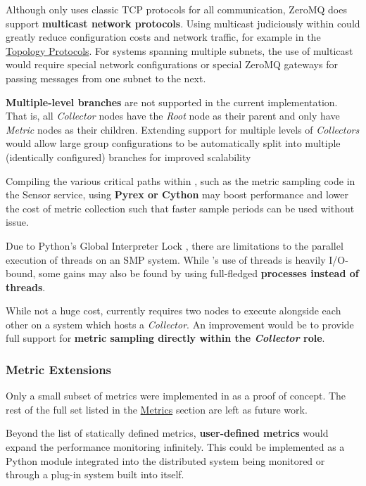 Although \dcamp only uses classic TCP protocols for all communication, ZeroMQ does support \textbf{multicast network
protocols}. Using multicast judiciously within \dcamp could greatly reduce configuration costs and network traffic, for
example in the \hyperref[proto_topo]{Topology Protocols}. For \dcamp systems spanning multiple subnets, the use of
multicast would require special network configurations or special ZeroMQ gateways for passing messages from one subnet
to the next.

\textbf{Multiple-level branches} are not supported in the current implementation. That is, all \textit{Collector} nodes
have the \textit{Root} node as their parent and only have \textit{Metric} nodes as their children. Extending support for
multiple levels of \textit{Collectors} would allow large group configurations to be automatically split into multiple
(identically configured) branches for improved scalability

Compiling the various critical paths within \dcampns, such as the metric sampling code in the Sensor service, using
\textbf{Pyrex or Cython} may boost performance \cite{needed} and lower the cost of metric collection such that faster
sample periods can be used without issue.

Due to Python's Global Interpreter Lock \cite{py-threads}, there are limitations to the parallel execution of threads on
an SMP system. While \dcampns's use of threads is heavily I/O-bound, some gains may also be found by using full-fledged
\textbf{processes instead of threads}.

While not a huge cost, \dcamp currently requires two nodes to execute alongside each other on a system which hosts a
\textit{Collector}. An improvement would be to provide full support for \textbf{metric sampling directly within the
\textit{Collector} role}.

\subsubsection{Metric Extensions}

Only a small subset of metrics were implemented in \dcamp as a proof of concept. The rest of the full set listed in the
\hyperref[dcamp_metrics]{\dcamp Metrics} section are left as future work.

Beyond the list of statically defined metrics, \textbf{user-defined metrics} would expand the performance monitoring
infinitely. This could be implemented as a Python module integrated into the distributed system being monitored or
through a plug-in system built into \dcamp itself.

